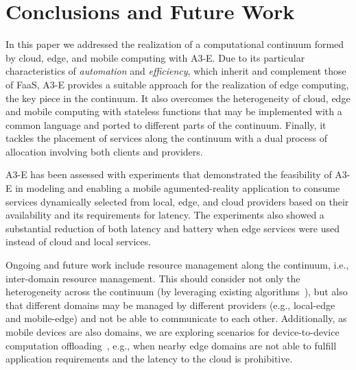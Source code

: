 \section{Conclusions and Future Work}\label{sec:conclusions}

In this paper we addressed the realization of a computational continuum formed by cloud, edge, and mobile computing with A3-E. Due to its particular characteristics of \textit{automation} and \textit{efficiency}, which inherit and complement those of FaaS, A3-E provides a suitable approach for the realization of edge computing, the key piece in the continuum. It also overcomes the heterogeneity of cloud, edge and mobile computing with stateless functions that may be implemented with a common language and ported to different parts of the continuum. Finally, it tackles the placement of services along the continuum with a dual process of allocation involving both clients and providers.

A3-E has been assessed with experiments that demonstrated the feasibility of A3-E in modeling and enabling a mobile agumented-reality application to consume services dynamically selected from local, edge, and cloud providers based on their availability and its requirements for latency. The experiments also showed a substantial reduction of both latency and battery when edge services were used instead of cloud and local services. 

Ongoing and future work include resource management along the continuum, i.e., inter-domain resource management. This should consider not only the heterogeneity across the continuum (by leveraging existing algorithms~\cite{Tarneberg2017}), but also that different domains may be managed by different providers (e.g., local-edge and mobile-edge) and not be able to communicate to each other. Additionally, as mobile devices are also domains, we are exploring scenarios for device-to-device computation offloading~\cite{Mendonca2016A3droid}, e.g., when nearby edge domains are not able to fulfill application requirements and the latency to the cloud is prohibitive.
